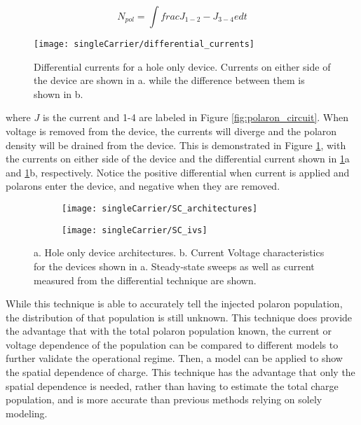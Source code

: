 \documentclass[../thesis.tex]{subfiles}
\begin{document}
\begin{equation}
N_{pol}=\int frac{J_{1-2}-J_{3-4}}{e}dt
\label{eqn:polaron_population_calculation}
\end{equation}

\begin{figure}[ht]
\centering
\texttt{[image: singleCarrier/differential\_currents]}
\caption{Differential currents for a hole only device. Currents on either side of the device are shown in a. while the difference between them is shown in b.}
\label{fig:differential_currents}
\end{figure}

where $J$ is the current and 1-4 are labeled in Figure \ref{fig:polaron_circuit}.
When voltage is removed from the device, the currents will diverge and the polaron density will be drained from the device.
This is demonstrated in Figure \ref{fig:differential_currents}, with the currents on either side of the device and the differential current shown in \ref{fig:differential_currents}a and \ref{fig:differential_currents}b, respectively.
Notice the positive differential when current is applied and polarons enter the device, and negative when they are removed.

\begin{figure}[hb]
    \centering%
    \begin{subfigure}{.3\textwidth}
    \texttt{[image: singleCarrier/SC\_architectures]}
    \caption{}
    \label{fig:SC_architectures}\par\vfill
    \end{subfigure}
    \begin{subfigure}{.3\textwidth}
    \texttt{[image: singleCarrier/SC\_ivs]}
    \caption{}
    \label{fig:SC_ivs}
    \end{subfigure}
\caption{a. Hole only device architectures. b. Current Voltage characteristics for the devices shown in a.  Steady-state sweeps as well as current measured from the differential technique are shown.}
\end{figure}

While this technique is able to accurately tell the injected polaron population, the distribution of that population is still unknown.
This technique does provide the advantage that with the total polaron population known, the current or voltage dependence of the population can be compared to different models to further validate the operational regime.
Then, a model can be applied to show the spatial dependence of charge.\supercite{Pope1999,Mark1962,Lampert2002a}
This technique has the advantage that only the spatial dependence is needed, rather than having to estimate the total charge population, and is more accurate than previous methods relying on solely modeling.
\end{document}
